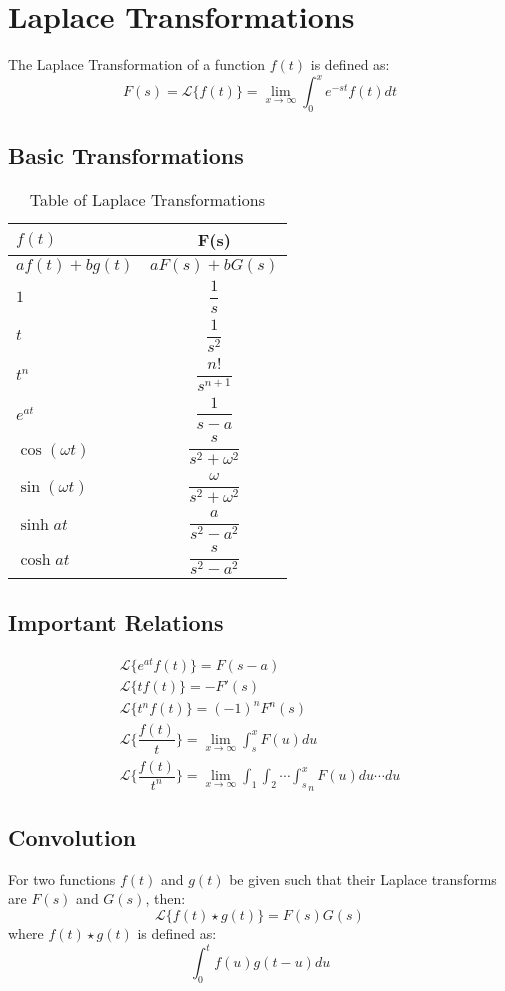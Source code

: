 \large{\chapter{Laplace Transformations}}
The Laplace Transformation of a function $f(t)$ is defined as:
\begin{equation}
	F(s)=\mathcal{L} \lbrace f(t)\rbrace=\lim_{x\to\infty}\int_0^x e^{-st}f(t) dt
\end{equation}
\section{Basic Transformations}
\begin{table}[htbp]
	\centering
	\begin{tabular}{l c}
		\toprule
		$f(t)$&F(s)\\
		\midrule
		$af(t)+bg(t)$&$aF(s)+bG(s)$\\
		$1$&$\dfrac{1}{s}$\\
		$t$&$\dfrac{1}{s^2}$\\
		$t^n$&$\dfrac{n!}{s^{n+1}}$\\
		$e^{at}$&$\dfrac{1}{s-a}$\\
		$\cos (\omega t)$&$\dfrac{s}{s^2+\omega^2}$\\
		$\sin (\omega t)$&$\dfrac{\omega}{s^2+\omega^2} $\\
		$\sinh at$&$\dfrac{a}{s^2-a^2}$\\
		$\cosh at$&$\dfrac{s}{s^2-a^2}$\\
		\bottomrule
	\end{tabular}
	\caption{Table of Laplace Transformations}
	\label{laplace}
\end{table}

\section{Important Relations}
\begin{align}
	\mathcal{L}\lbrace e^{at} f(t)\rbrace=F(s-a)\\
	\mathcal{L}\lbrace t f(t)\rbrace=-F'(s)\\
	\mathcal{L}\lbrace t^n f(t)\rbrace=(-1)^n F^n(s)\\
	\mathcal{L}\lbrace \dfrac{f(t)}{t} \rbrace=\lim_{x\to\infty} \int_s^x F(u) du\\
	\mathcal{L}\lbrace \dfrac{f(t)}{t^n} \rbrace=\lim_{x\to\infty} \int_1\int_2\cdots{\int_s^x}_n F(u) du\cdots du
\end{align}

\section{Convolution}
For two functions $f(t)$ and $g(t)$ be given such that their Laplace transforms are $F(s)$ and $G(s)$, then:
\begin{equation}
	\mathcal{L}\lbrace f(t) \star g(t) \rbrace=F(s)G(s)
\end{equation}
where $f(t) \star g(t)$ is defined as:
\begin{equation}
	\int_0^t f(u)g(t-u)du
\end{equation}

